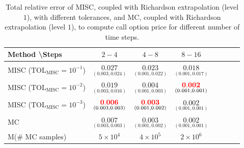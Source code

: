 \FloatBarrier
\begin{table}[h!]
	\centering
	\begin{tabular}{l*{6}{c}r}
		Method \textbackslash  Steps           & $2-4$ & $4-8$ & $8-16$  \\
		\hline

		MISC ($\text{TOL}_{\text{MISC}}=10^{-1}$)  &$\underset{(0.003,0.024)}{\mathbf{0.027}}$  &$\underset{(0.001,0.022)}{\mathbf{0.023}}$ & $\underset{(0.001,0.017)} {\mathbf{0.018}}$  \\

			MISC ($\text{TOL}_{\text{MISC}}=10^{-2}$)  & $\underset{(0.003,0.016)}{\mathbf{0.019}}$  & $\underset{(0.001,0.003)}{\mathbf{0.004}}$ & $\underset{(0.001,0.001)} {{\color{red}\mathbf{0.002}}}$  \\
		MISC ($\text{TOL}_{\text{MISC}}=10^{-3}$)  & $\underset{(0.003,0.003)}{{\color{red}\mathbf{0.006}}}$  & $\underset{(0.001,0.002)}{{\color{red}\mathbf{0.003}}}$ & $\underset{(0.001,0.001)} {\mathbf{0.002}}$  \\
	
	\hline

		MC    & $\underset{(0.003,0.003)}{\mathbf{0.007}}$  &   $\underset{(0.001,0.002)}{\mathbf{0.003}}$  &  $\underset{(0.001,0.001)}{\mathbf{0.002}}$  \\
			M(\# MC samples) & $5 \times 10^4$  &   $4 \times 10^5$  &  $2 \times 10^6$  \\
		\hline
	\end{tabular}
	\caption{Total relative error of MISC, coupled with Richardson extrapolation (level $1$), with different tolerances, and MC, coupled with Richardson extrapolation (level $1$), to compute call option price  for different number of time steps.}
	\label{Total  error of MISC and MC to compute Call option price of the different tolerances for different number of time steps. Case set $3$ parameters, with Richardson extrapolation(level $1$). The numbers between parentheses are the corresponding absolute errors.}
\end{table}

\FloatBarrier

